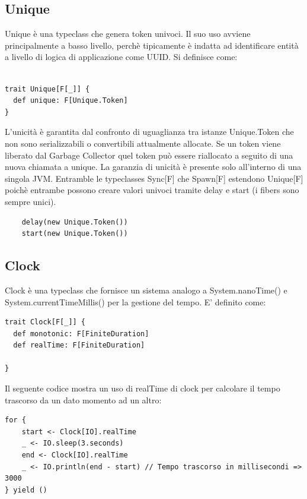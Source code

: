 \subsection{Unique}
Unique è una typeclass che genera token univoci. Il suo uso avviene principalmente a basso livello, perchè tipicamente è indatta ad identificare entità a livello di logica di applicazione come UUID. Si definisce come: 
\begin{verbatim}

trait Unique[F[_]] {
  def unique: F[Unique.Token]
}
\end{verbatim}

L'unicità è garantita dal confronto di uguaglianza tra istanze Unique.Token che non sono serializzabili o convertibili attualmente allocate. Se un token viene liberato dal Garbage Collector quel token può essere
riallocato a seguito di una nuova chiamata a unique. La garanzia di unicità è  presente solo all’interno di una singola JVM. Entramble le typeclasses Sync[F] che Spawn[F] estendono Unique[F] poichè entrambe possono creare valori univoci tramite delay e start (i fibers sono sempre unici). 
\begin{verbatim}
    delay(new Unique.Token())
    start(new Unique.Token())
\end{verbatim}

\subsection{Clock}
Clock è una typeclass che fornisce un sistema analogo a System.nanoTime() e System.currentTimeMillis() per la gestione del tempo. E' definito come:
\begin{verbatim}
trait Clock[F[_]] {
  def monotonic: F[FiniteDuration]
  def realTime: F[FiniteDuration]

}
\end{verbatim}

Il seguente codice mostra un uso di realTime di clock per calcolare il tempo trascorso da un dato momento ad un altro:

\begin{verbatim}
for {
    start <- Clock[IO].realTime
    _ <- IO.sleep(3.seconds)
    end <- Clock[IO].realTime
    _ <- IO.println(end - start) // Tempo trascorso in millisecondi => 3000
} yield ()
    
\end{verbatim}

